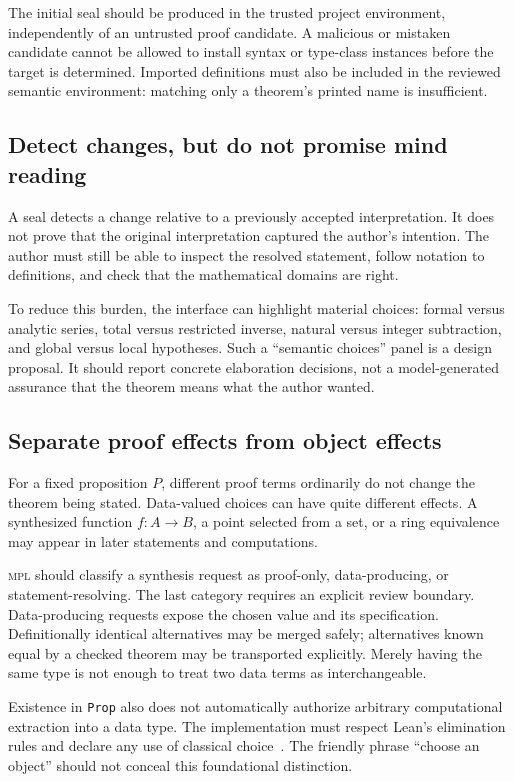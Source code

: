 \documentclass[11pt,a4paper]{article}
\newcommand{\MPL}{\textnormal{\textsc{mpl}}}
\newcommand{\code}[1]{\texttt{#1}}
\theoremstyle{remark}
\begin{document}
The initial seal should be produced in the trusted project environment, independently of an untrusted proof candidate. A malicious or mistaken candidate cannot be allowed to install syntax or type-class instances before the target is determined. Imported definitions must also be included in the reviewed semantic environment: matching only a theorem's printed name is insufficient.

\subsection{Detect changes, but do not promise mind reading}

A seal detects a change relative to a previously accepted interpretation. It does not prove that the original interpretation captured the author's intention. The author must still be able to inspect the resolved statement, follow notation to definitions, and check that the mathematical domains are right.

To reduce this burden, the interface can highlight material choices: formal versus analytic series, total versus restricted inverse, natural versus integer subtraction, and global versus local hypotheses. Such a ``semantic choices'' panel is a design proposal. It should report concrete elaboration decisions, not a model-generated assurance that the theorem means what the author wanted.

\subsection{Separate proof effects from object effects}

For a fixed proposition $P$, different proof terms ordinarily do not change the theorem being stated. Data-valued choices can have quite different effects. A synthesized function $f:A\to B$, a point selected from a set, or a ring equivalence may appear in later statements and computations.

\MPL{} should classify a synthesis request as proof-only, data-producing, or statement-resolving. The last category requires an explicit review boundary. Data-producing requests expose the chosen value and its specification. Definitionally identical alternatives may be merged safely; alternatives known equal by a checked theorem may be transported explicitly. Merely having the same type is not enough to treat two data terms as interchangeable.

Existence in \code{Prop} also does not automatically authorize arbitrary computational extraction into a data type. The implementation must respect Lean's elimination rules and declare any use of classical choice~\cite{lean-axioms}. The friendly phrase ``choose an object'' should not conceal this foundational distinction.
\end{document}
